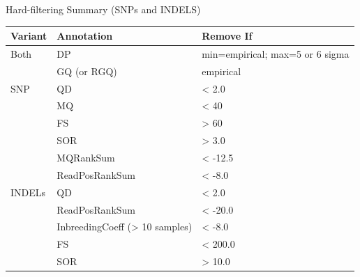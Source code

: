 \documentclass[t,10pt]{beamer}
\begin{document}
\begin{frame}[label={sec:orgheadline16}]{Hard-filtering Summary (SNPs and INDELS)}
\begin{center}
\begin{tabular}{lll}
\hline
\alert{Variant} & \alert{Annotation} & \alert{Remove If}\\
\hline
\alert{Both} & DP & min=empirical; max=5 or 6 sigma\\
 & GQ (or RGQ) & empirical\\
\hline
\alert{SNP} & QD & < 2.0\\
 & MQ & < 40\\
 & FS & > 60\\
 & SOR & > 3.0\\
 & MQRankSum & < -12.5\\
 & ReadPosRankSum & < -8.0\\
\hline
\alert{INDELs} & QD & < 2.0\\
 & ReadPosRankSum & < -20.0\\
 & InbreedingCoeff (> 10 samples) & < -8.0\\
 & FS & < 200.0\\
 & SOR & > 10.0\\
\hline
\end{tabular}
\end{center}
\end{frame}
\end{document}
